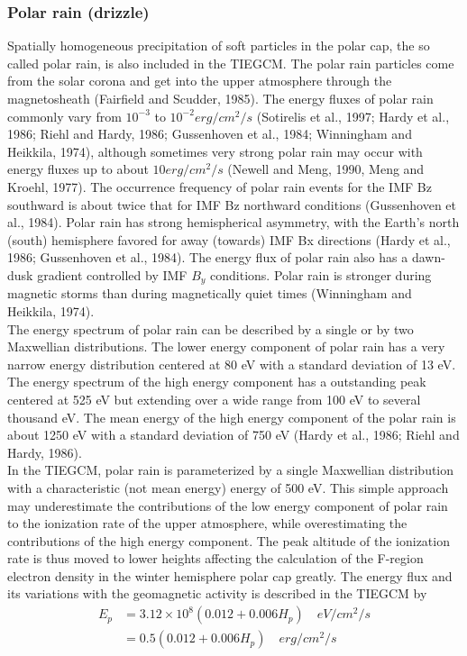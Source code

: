\begin{enumerate}
\begin{enumerate}
\subsubsection{Polar rain (drizzle)}\label{cap:aurora_polarrain}
%
Spatially homogeneous precipitation of soft particles in the polar cap, 
the so called polar rain, is also included in the TIEGCM. The polar rain 
particles come from the solar corona and get into the upper atmosphere 
through the magnetosheath (Fairfield and Scudder, 1985). The energy fluxes 
of polar rain commonly vary from $10^{-3}$ to $10^{-2} erg/cm^2/s$ (Sotirelis et al., 1997; 
Hardy et al., 1986; Riehl and Hardy, 1986; Gussenhoven et al., 1984; 
Winningham and Heikkila, 1974), although sometimes very strong polar rain 
may occur with energy fluxes up to about $10 erg/cm^2/s$ (Newell and Meng, 
1990, Meng and Kroehl, 1977). The occurrence frequency of polar rain events 
for the IMF Bz southward is about twice that for IMF Bz northward conditions 
(Gussenhoven et al., 1984). Polar rain has strong hemispherical asymmetry, with 
the Earth's north (south) hemisphere favored for away (towards) IMF Bx directions 
(Hardy et al., 1986; Gussenhoven et al., 1984). The energy flux of polar rain also 
has a dawn-dusk gradient controlled by IMF $B_y$ conditions. Polar rain is stronger 
during magnetic storms than during magnetically quiet times 
(Winningham and Heikkila, 1974).  \\
%
The energy spectrum of polar rain can be described by a 
single or by two Maxwellian distributions. The lower energy 
component of polar rain has a very narrow energy distribution 
centered at 80 eV with a standard deviation of 13 eV. The energy 
spectrum of the high energy component has a outstanding peak centered 
at 525 eV but extending over a wide range from 100 eV to several thousand 
eV. The mean energy of the high energy component of the polar rain is about 
1250 eV with a standard deviation of 750 eV (Hardy et al., 1986; 
Riehl and Hardy, 1986). \\
%
In the TIEGCM, polar rain is parameterized by a single 
Maxwellian distribution with a characteristic (not mean energy) 
energy of 500 eV. This simple approach may underestimate the 
contributions of the low energy component of polar rain to the 
ionization rate of the upper atmosphere, while overestimating the 
contributions of the high energy component. The peak altitude of the 
ionization rate is thus moved to lower heights affecting the calculation 
of the F-region electron density in the winter hemisphere polar cap 
greatly. The energy flux and its variations with the geomagnetic
 activity is described in the TIEGCM by
%
\begin{equation}
  \begin{split}
      E_p & = 3.12 \times 10^8 (0.012 + 0.006 H_p) \quad  eV/cm^2/s \\
          & = 0.5(0.012 + 0.006  H_p) \quad  erg/cm^2/s
    \label{eq:aurora_13}
  \end{split}
\end{equation}
%   
%

\end{enumerate}
\end{enumerate}

